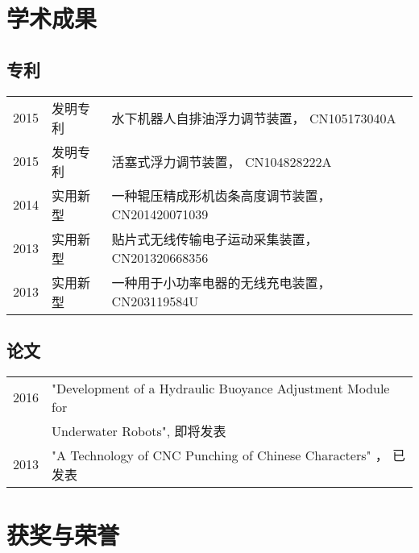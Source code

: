 \documentclass[letterpaper]{deedy-resume} %
\begin{document}
\begin{minipage}[t]{0.65\textwidth}
\sectionspace %


\section{学术成果}
\subsection{专利}
\begin{tabular}{rll}
2015	 & 发明专利 &                       水下机器人自排油浮力调节装置， CN105173040A\\
2015	 & 发明专利 &                       活塞式浮力调节装置， CN104828222A\\
2014	 & 实用新型 &                       一种辊压精成形机齿条高度调节装置， CN201420071039\\
2013	 & 实用新型 &                       贴片式无线传输电子运动采集装置， CN201320668356\\
2013     & 实用新型 &                       一种用于小功率电器的无线充电装置， CN203119584U\\
\end{tabular}

\sectionspace %

\subsection{论文}
\begin{tabular}{rl}
2016    & "Development of a Hydraulic Buoyance Adjustment Module for  \\
        & Underwater Robots", 即将发表\\
2013    & "A Technology of CNC Punching of Chinese Characters" ， 已发表\\
\end{tabular}

\sectionspace %

\section{获奖与荣誉}


\end{minipage}
\end{document}
